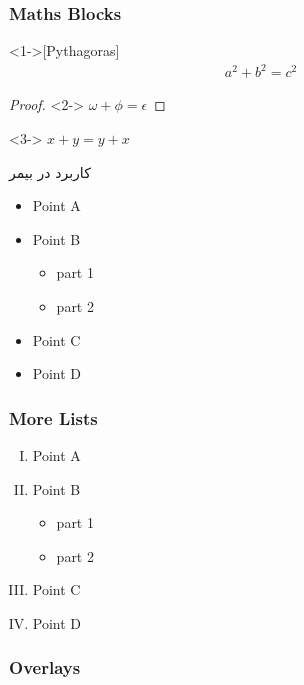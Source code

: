 \begin{frame}
\frametitle{Maths Blocks}
\begin{theorem}<1->[Pythagoras] 
\begin{align}
a^2 + b^2 = c^2
\end{align}
\end{theorem}
\begin{proof}<2->
$\omega +\phi = \epsilon $
\end{proof}
\begin{corollary}<3->
$ x + y = y + x  $
\end{corollary}
\end{frame}


\begin{frame}
کاربرد  در بیمر
\begin{itemize}
\pause
\item Point A
\pause
\item Point B
\begin{itemize}
\pause
\item part 1
\pause
\item part 2
\end{itemize}
\pause
\item Point C
\pause
\item Point D
\end{itemize}
\end{frame}

\begin{frame}
\frametitle{More Lists}
\begin{enumerate}[(I)]
\item<1-> Point A
\item<2-> Point B
\begin{itemize}
\item<3-> part 1
\item<4-> part 2
\end{itemize}
\item<5-> Point C
\item<6-> Point D
\end{enumerate}
\end{frame}


%
%

\begin{frame}
\frametitle{Overlays}


\end{frame}







